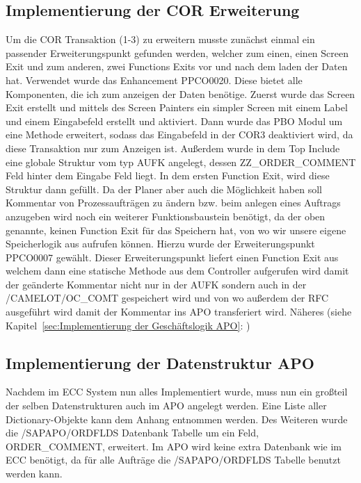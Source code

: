 \subsection{Implementierung der COR Erweiterung}
\label{sec:Implementierung der COR Erweiterung}   
Um die COR Transaktion (1-3) zu erweitern musste zunächst einmal ein passender Erweiterungspunkt gefunden werden, welcher zum einen, einen Screen Exit und zum anderen, zwei Functions Exits vor und nach dem laden der Daten hat. Verwendet wurde das Enhancement PPCO0020. Diese bietet alle Komponenten, die ich zum anzeigen der Daten benötige. Zuerst wurde das Screen Exit erstellt und mittels des Screen Painters ein simpler Screen mit einem Label und einem Eingabefeld erstellt und aktiviert. Dann wurde das \ac{PBO} Modul um eine Methode erweitert, sodass das Eingabefeld in der COR3 deaktiviert wird, da diese Transaktion nur zum Anzeigen ist. Außerdem wurde in dem Top Include eine globale Struktur vom typ AUFK angelegt, dessen ZZ\_ORDER\_COMMENT Feld hinter dem Eingabe Feld liegt. In dem ersten Function Exit, wird diese Struktur dann gefüllt. Da der Planer aber auch die Möglichkeit haben soll Kommentar von Prozessaufträgen zu ändern bzw. beim anlegen eines Auftrags anzugeben wird noch ein weiterer Funktionsbaustein benötigt, da der oben genannte, keinen Function Exit für das Speichern hat, von wo wir unsere eigene Speicherlogik aus aufrufen können. Hierzu wurde der Erweiterungspunkt PPCO0007 gewählt. Dieser Erweiterungspunkt liefert einen Function Exit aus welchem dann eine statische Methode aus dem Controller aufgerufen wird damit der geänderte Kommentar nicht nur in der AUFK sondern auch in der /CAMELOT/OC\_COMT gespeichert wird und von wo außerdem der \ac{RFC} ausgeführt wird damit der Kommentar ins \ac{APO} transferiert wird. Näheres (siehe Kapitel~\ref{sec:Implementierung der Geschäftslogik APO}: )

\subsection{Implementierung der Datenstruktur APO}
\label{sec:Implementierung der Datenstruktur APO} 
Nachdem im \ac{ECC} System nun alles Implementiert wurde, muss nun ein großteil der selben Datenstrukturen auch im \ac{APO} angelegt werden. Eine Liste aller Dictionary-Objekte kann dem Anhang entnommen werden. Des Weiteren wurde die /SAPAPO/ORDFLDS Datenbank Tabelle um ein Feld, ORDER\_COMMENT, erweitert. Im \ac{APO} wird keine extra Datenbank wie im \ac{ECC} benötigt, da für alle Aufträge die /SAPAPO/ORDFLDS Tabelle benutzt werden kann.

